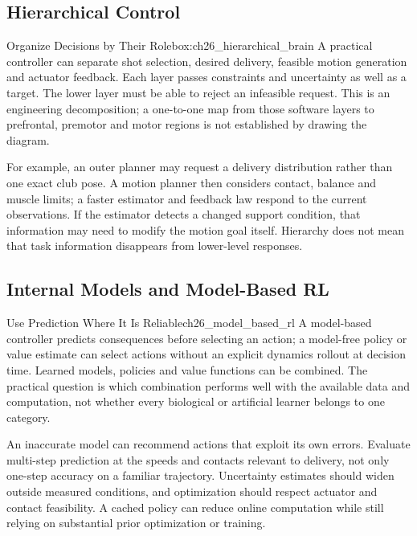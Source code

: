 \subsection{Hierarchical Control}
\label{subsec:ch26_hierarchical}

\begin{principle}{Organize Decisions by Their Role}{box:ch26_hierarchical_brain}
A practical controller can separate shot selection, desired delivery, feasible motion generation and actuator feedback. Each layer passes constraints and uncertainty as well as a target. The lower layer must be able to reject an infeasible request. This is an engineering decomposition; a one-to-one map from those software layers to prefrontal, premotor and motor regions is not established by drawing the diagram.
\end{principle}

For example, an outer planner may request a delivery distribution rather than one exact club pose. A motion planner then considers contact, balance and muscle limits; a faster estimator and feedback law respond to the current observations. If the estimator detects a changed support condition, that information may need to modify the motion goal itself. Hierarchy does not mean that task information disappears from lower-level responses.

\subsection{Internal Models and Model-Based RL}
\label{subsec:ch26_model_based}

\begin{example}{Use Prediction Where It Is Reliable}{ch26_model_based_rl}
A model-based controller predicts consequences before selecting an action; a model-free policy or value estimate can select actions without an explicit dynamics rollout at decision time. Learned models, policies and value functions can be combined. The practical question is which combination performs well with the available data and computation, not whether every biological or artificial learner belongs to one category.
\end{example}

An inaccurate model can recommend actions that exploit its own errors. Evaluate multi-step prediction at the speeds and contacts relevant to delivery, not only one-step accuracy on a familiar trajectory. Uncertainty estimates should widen outside measured conditions, and optimization should respect actuator and contact feasibility. A cached policy can reduce online computation while still relying on substantial prior optimization or training.

